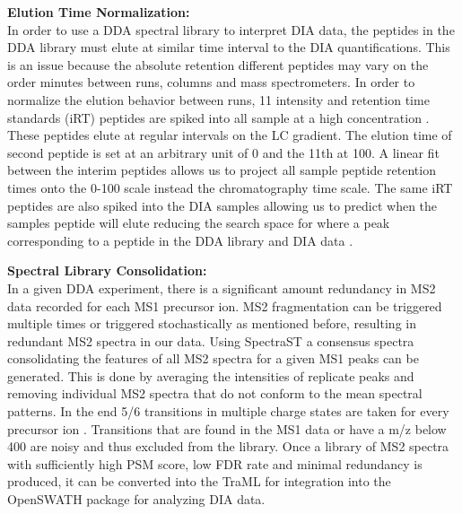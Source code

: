 \documentclass[a4paper,11pt,twoside]{book}
\begin{document}
	\textbf{Elution Time Normalization:}\\
	In order to use a DDA spectral library to interpret DIA data, the peptides in the DDA library must elute at similar time interval to the DIA quantifications. This is an issue because the absolute retention different peptides may vary on the order minutes between runs, columns and mass spectrometers. In order to normalize the elution behavior between runs, 11 intensity and retention time standards (iRT) peptides are spiked into all sample at a high concentration \citep{Bruderer2016HighprecisioniRT}. These peptides elute at regular intervals on the LC gradient. The elution time of second peptide is set at an arbitrary unit of 0 and the 11th at 100. A linear fit between the interim peptides allows us to project all sample peptide retention times onto the 0-100 scale instead the chromatography time scale. The same iRT peptides are also spiked into the DIA samples allowing us to predict when the samples peptide will elute reducing the search space for where a peak corresponding to a peptide in the DDA library and DIA data \citep{Bruderer2016HighprecisioniRT}.
	
	\textbf{Spectral Library Consolidation:}\\
In a given DDA experiment, there is a significant amount redundancy in MS2 data recorded for each MS1 precursor ion. MS2 fragmentation can be triggered multiple times or triggered stochastically as mentioned before, resulting in redundant MS2 spectra in our data. Using SpectraST a consensus spectra consolidating the features of all MS2 spectra for a given MS1 peaks can be generated. This is done by averaging the intensities of replicate peaks and removing individual MS2 spectra that do not conform to the mean spectral patterns\citep{Lam2008BuildingProteomics}. In the end 5/6 transitions in multiple charge states are taken for every precursor ion \citep{Schubert2015BuildingData}. Transitions that are found in the MS1 data or have a m/z below 400 are noisy and thus excluded from the library. Once a library of MS2 spectra with sufficiently high PSM score, low FDR rate and minimal redundancy is produced, it can be converted into the TraML for integration into the OpenSWATH package for analyzing DIA data.
	
\end{document}
